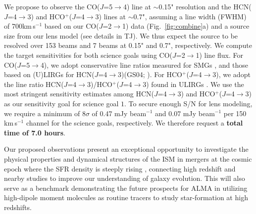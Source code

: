 \documentclass[12pt,a4paper]{article}  %
\newcommand{\LIR}{\mbox{L$_{\rm IR}$}\xspace}
\newcommand{\rarr}{$\rightarrow$}
\newcommand{\bco}{\mbox{CO($J$=2\rarr1)}\xspace}
\newcommand{\eco}{\mbox{CO($J$=5\rarr4)}\xspace}
\newcommand{\dhcn}{HCN($J$=4\rarr3)\xspace}
\newcommand{\hcop}{HCO$^+$\xspace}
\newcommand{\dhcop}{HCO$^+$($J$=4\rarr3)\xspace}
\newcommand{\kms}{km\,s$^{-1}$\xspace}
\newcommand{\pmOne}{\mbox{$^{-1}$}\xspace}
\newcommand{\Fig}[1]{Fig.~\ref{fig:#1}}
\begin{document}
We propose to observe the \eco line at $\sim$0.15" resolution
and the \dhcn and \dhcop lines at $\sim$0.7", assuming a line width 
(FWHM) of 700\kms based on our \bco data
(\Fig{combine}a) and a source size from our lens model (see details in TJ).
We thus expect the source to be resolved over 153 beams 
and 7 beams at 0.15" and 0.7", respectively. 
We compute the target sensitivities for both science goals using \bco line flux. 
For \eco, we adopt conservative 
line ratios measured for SMGs \citep[][see TJ for details]{CW13},
and those based on (U)LIRGs for \dhcn (GS04; \citealt{Papadopoulos07a}).
For \dhcop, we adopt the line ratio \dhcn/\dhcop found in ULIRGs 
\citep{Greve09a}. 
We use the most stringent sensitivity estimates 
among \dhcn and \dhcop as our sensitivity goal for science goal $1$. %
To secure enough S/N for lens modeling, 
we require a minimum of 8$\sigma$ of 0.47 mJy beam\pmOne and 0.07 mJy beam\pmOne
per 150 \kms channel 
for the science goals, respectively. 
We therefore request a \textbf{total time of 7.0 hours}.%

\par 
Our proposed observations present an exceptional opportunity to investigate
the physical properties and dynamical structures of 
the ISM in mergers at the cosmic epoch 
where the SFR density is steeply rising \citep{LeFloch05a}, 
connecting high redshift and nearby studies to improve our understanding of galaxy evolution.
%
This will also %
serve as a benchmark demonstrating the future prospects for ALMA in 
utilizing high-dipole moment molecules as routine tracers to study star-formation 
at high redshifts.
\end{document}
